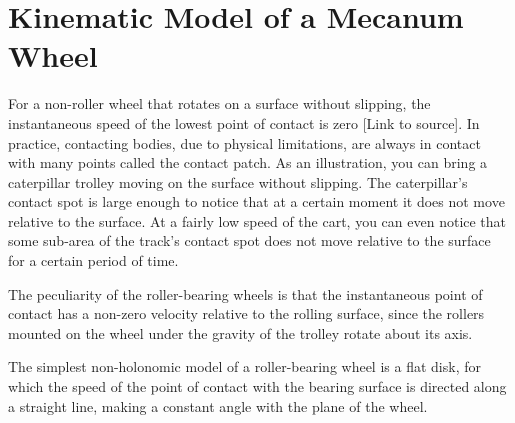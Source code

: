 \documentclass[oneside,final,14pt]{extreport}
\newcommand{\cmmnt}[1]{\ignorespaces}
\begin{document}
\iffalse
In ref, the dynamic model of a trolley with N roller-bearing wheels is considered in more detail. The trolley model is built on the assumption that the roller-bearing wheel model is a solid disk, the speed of the lowest point of which is perpendicular to the direction of the roller axis at this point. In addition, the controllability criterion of such a model is considered, from which a number of restrictions on its design follow. For example, if the sum of the angle of the roller axis and the angle of rotation of the wheel of all roller-bearing wheels is equal, then such a model cannot move along an arbitrary trajectory. If these angles of the two wheels coincide, then a pair of wheels can be taken as one virtual wheel with the radius vector $ r_{ij} = r_{i} - r_{j} $ in the local coordinate system and the moment $ T_{ij} = T_{i} + T_{j} $.
\fi
\chapter{Kinematic Model of a Mecanum Wheel}
For a non-roller wheel that rotates on a surface without slipping, the instantaneous speed of the lowest point of contact is zero [Link to source]. In practice, contacting bodies, due to physical limitations, are always in contact with many points called the contact patch. As an illustration, you can bring a caterpillar trolley moving on the surface without slipping. The caterpillar’s ​​contact spot is large enough to notice that at a certain moment it does not move relative to the surface. At a fairly low speed of the cart, you can even notice that some sub-area of ​​the track’s contact spot does not move relative to the surface for a certain period of time.

The peculiarity of the roller-bearing wheels is that the instantaneous point of contact has a non-zero velocity relative to the rolling surface, since the rollers mounted on the wheel under the gravity of the trolley rotate about its axis. \cmmnt{In the case of an roller bearing  wheel whose roller axes are parallel to the plane of the wheel disc, slipping does not occur, which simplifies the process of constructing a mathematical model}

 The simplest non-holonomic model of a roller-bearing wheel is a flat disk, for which the speed of the point of contact with the bearing surface is directed along a straight line, making a constant angle with the plane of the wheel.

\begin{figure} [H]
\end{figure}
\end{document}
